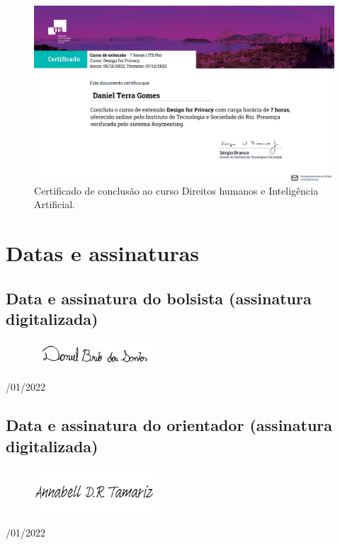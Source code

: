 \begin{figure}[h!tbp]
  \centering
  \begin{minipage}[b]{0.7\textwidth}
    \includegraphics[width=\textwidth]{Figures/its2.pdf}
    \caption{\label{Direitos} Certificado de conclusão ao curso Direitos humanos e Inteligência Artificial.}
  \end{minipage}
 
\end{figure}


\chapter{Datas e assinaturas}
\section{Data e assinatura do bolsista (assinatura digitalizada)}


\begin{figure}[H]
 \centering
 \includegraphics[width=0.4\textwidth]{Figures/Assinatura1.2.png}
\end{figure}
/01/2022

\section{Data e assinatura do orientador (assinatura digitalizada)}


\begin{figure}[H]
 \centering
 \includegraphics[width=0.4\textwidth]{Figures/assinatura_annabell.png}
\end{figure}
/01/2022

